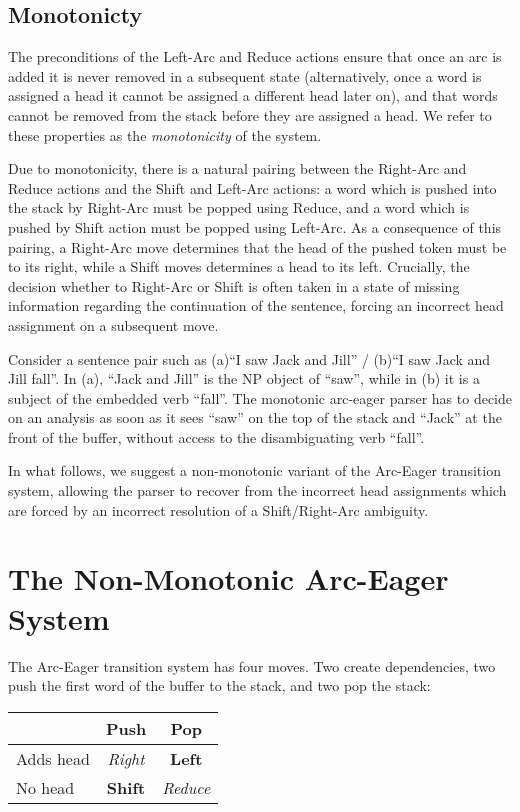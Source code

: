 \documentclass[11pt,letterpaper]{article}
\begin{document}
\subsection{Monotonicty}

The preconditions of the Left-Arc and Reduce actions ensure that once an
arc is added it is never removed in a subsequent state (alternatively,
once a word is assigned a head it cannot be assigned a different head
later on), and that words cannot be removed from the stack before they
are assigned a head. We refer to these properties as the
\textit{monotonicity} of the system.

Due to monotonicity, there is a natural pairing between the Right-Arc and
Reduce actions and the Shift and Left-Arc actions: a word which is pushed
into the stack by Right-Arc must be popped using Reduce,
 and a word which is pushed by Shift action must be popped
using Left-Arc.
As a consequence of this pairing, a Right-Arc move determines that the head of
the pushed token must be to its right, while a Shift moves determines a head
to its left. Crucially, the decision whether to Right-Arc or Shift is often taken
in a state of missing information regarding the continuation of the sentence,
forcing an incorrect head assignment on a subsequent move. 

Consider a sentence pair such as (a)``I saw Jack and Jill'' / (b)``I saw Jack and Jill
fall''. In (a), ``Jack and Jill'' is the NP object of ``saw'', while
in (b) it is a subject of the embedded verb ``fall''.  The monotonic arc-eager
parser has to decide on an analysis as soon as it sees ``saw'' on the top of the
stack and ``Jack'' at the front of the buffer, without access to the
disambiguating verb ``fall''.  

In what follows, we suggest a non-monotonic variant of the Arc-Eager transition
system, allowing the parser to recover from the incorrect head assignments
which are forced by an incorrect resolution of a Shift/Right-Arc ambiguity.

\section{The Non-Monotonic Arc-Eager System}

The Arc-Eager transition system \citep{nivre:04} has four moves. Two create 
dependencies, two push the first word of the buffer to the stack, and two pop 
the stack:

\begin{center}
    \begin{tabular}{l|cc}
             & Push  & Pop    \\
           \hline
           Adds head   & \emph{Right} & \textbf{Left}    \\
            No head    & \textbf{Shift} & \emph{Reduce}   \\
     \end{tabular}
\end{center}
\end{document}
